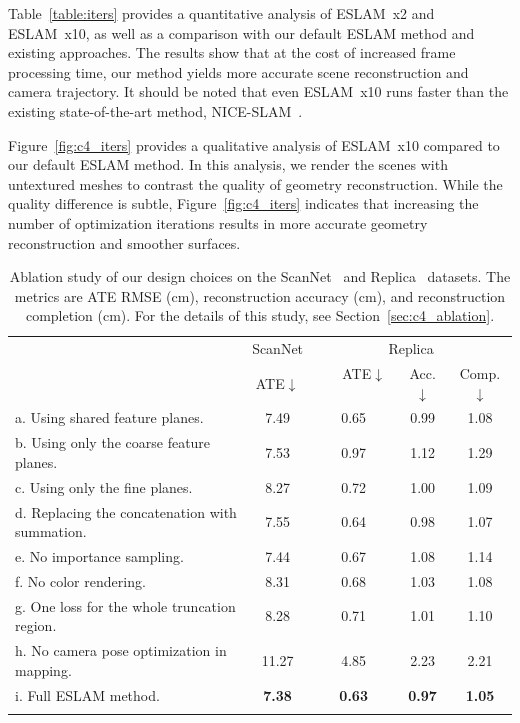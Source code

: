 Table~\ref{table:iters} provides a quantitative analysis of ESLAM~x2 and ESLAM~x10, as well as a comparison with our default ESLAM method and existing approaches. The results show that at the cost of increased frame processing time, our method yields more accurate scene reconstruction and camera trajectory. It should be noted that even ESLAM~x10 runs faster than the existing state-of-the-art method, NICE-SLAM~\citep{zhu2022nice}.

Figure~\ref{fig:c4_iters} provides a qualitative analysis of ESLAM~x10 compared to our default ESLAM method. In this analysis, we render the scenes with untextured meshes to contrast the quality of geometry reconstruction. While the quality difference is subtle, Figure~\ref{fig:c4_iters} indicates that increasing the number of optimization iterations results in more accurate geometry reconstruction and smoother surfaces.

\begin{table}[t]
    \begin{center}
        \begin{tabular}{l|c|ccc}
            \Xhline{2\arrayrulewidth}
            \multirow{2}{*}{Experiment} & \multicolumn{1}{c|}{ScanNet} &  \multicolumn{3}{c}{Replica}  \\
            
            & ATE$\downarrow$ & ~~~ATE$\downarrow$~~~ & Acc.$\downarrow$ & Comp.$\downarrow$ \\
    
            \hline
            a. Using shared feature planes. & \phantom{0}7.49 & 0.65 & 0.99 & 1.08 \\
            b. Using only the coarse feature planes. & \phantom{0}7.53 & 0.97 & 1.12 & 1.29 \\
            c. Using only the fine planes. & \phantom{0}8.27 & 0.72 & 1.00 & 1.09 \\
            d. Replacing the concatenation with summation. & \phantom{0}7.55 & 0.64 & 0.98 & 1.07 \\
            e. No importance sampling. & \phantom{0}7.44 & 0.67 & 1.08 & 1.14 \\
            f. No color rendering. & \phantom{0}8.31 & 0.68 & 1.03 & 1.08 \\
            g. One loss for the whole truncation region. & \phantom{0}8.28 & 0.71 & 1.01 & 1.10 \\
            h. No camera pose optimization in mapping. & 11.27 & 4.85 & 2.23 & 2.21 \\
            i. Full ESLAM method. & \phantom{0}\textbf{7.38} & \textbf{0.63} & \textbf{0.97} & \textbf{1.05} \\
    
            \Xhline{2\arrayrulewidth}
        \end{tabular}
    \end{center}
    \caption{Ablation study of our design choices on the ScanNet~\citep{dai2017scannet} and Replica~\citep{replica19arxiv} datasets. The metrics are ATE RMSE (cm), reconstruction accuracy (cm), and reconstruction completion (cm). For the details of this study, see Section~\ref{sec:c4_ablation}.}
    \label{table:ab_choices}
\end{table}

